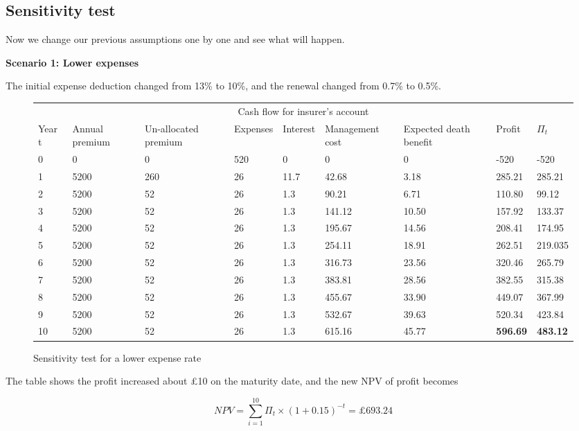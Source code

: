 \documentclass{report}
\begin{document}
\subsection{Sensitivity test}

Now we change our previous assumptions one by one and see what will happen.

\textbf{Scenario 1: Lower expenses} 

The initial expense deduction changed from 13\% to 10\%, and the renewal changed from 0.7\% to 0.5\%.




\begin{figure}[H]
\hfill
    \centering
\begin{tabular}{p{0.8cm} p{1.5cm} p{1.5cm} p{1.2cm} p{1cm} p{2cm}p{1.5cm} p{1.5cm} p{1.5cm} }
\toprule
\multicolumn{9}{c}{Cash flow for insurer's account} \\
\cmidrule(r){3-7}

Year t & Annual premium & Un-allocated premium & Expenses & Interest &Management cost& Expected death benefit & Profit& $\Pi_t$  \\
\midrule

0&0&0&520&0&0&0&-520&-520\\
1&5200&260&26&11.7&42.68&3.18&285.21&285.21\\
2&5200&52&26&1.3&90.21&6.71&110.80&99.12\\
3&5200&52&26&1.3&141.12&10.50&157.92&133.37\\
4&5200&52&26&1.3&195.67&14.56&208.41&174.95\\
5&5200&52&26&1.3&254.11&18.91&262.51&219.035\\
6&5200&52&26&1.3&316.73&23.56&320.46&265.79\\
7&5200&52&26&1.3&383.81&28.56&382.55&315.38\\
8&5200&52&26&1.3&455.67&33.90&449.07&367.99\\
9&5200&52&26&1.3&532.67&39.63&520.34&423.84\\
10&5200&52&26&1.3&615.16&45.77&\textbf{596.69}&\textbf{483.12}\\

\bottomrule
\end{tabular}
\caption{Sensitivity test for a lower expense rate}
\label{determ-sensi-expense}
\end{figure}

The table shows the profit increased about \pounds 10 on the maturity date, and the new NPV of profit becomes 

\[
 NPV=\sum_{i=1}^{10} \Pi_t \times (1+0.15)^{-t} = \pounds693.24 
\]
 
\end{document}
